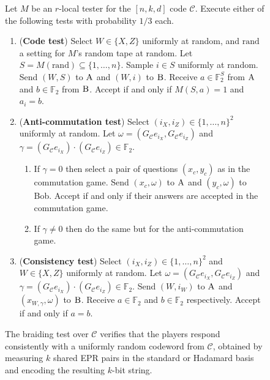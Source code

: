 \documentclass[11pt]{article}
\theoremstyle{definition}
\newcommand{\code}{\mathcal{C}}
\newcommand{\field}{\mathbb{F}_2}
\newcommand{\rand}{\textrm{rand}}
\newcommand{\labelstyle}[1]{\ensuremath{\textsc{#1}}\xspace}
\newcommand{\alice}{\labelstyle{A}}
\newcommand{\bob}{\labelstyle{B}}
\newenvironment{gamespec}{
  \begin{mdframed}[style=figstyle]}{
  \end{mdframed}}
\begin{document}
\begin{figure}[!htbp]
  \centering
  \begin{gamespec}
Let $M$ be an $r$-local tester for the $[n,k,d]$ code $\code$.  Execute either of the following tests with probability $1/3$ each. 
    \begin{enumerate}
      \setlength\itemsep{1pt}
    \item (\textbf{Code test}) Select $W\in \{X,Z\}$ uniformly at random, and $\rand$ a setting for $M$'s random tape at random. Let $S=M(\rand)\subseteq\{1,\ldots,n\}$. Sample $i\in S$ uniformly at random. Send $(W,S)$ to $\alice$ and $(W,i)$ to $\bob$. Receive $a\in \field^S$ from $\alice$ and $b\in \field$ from $\bob$. Accept if and only if $M(S,a)=1$ and $a_i = b$.  
    \item (\textbf{Anti-commutation test}) Select $(i_X,i_Z)\in \{1,\ldots,n\}^2 $ uniformly at random. Let $\omega = (G_\code e_{i_X}, G_\code e_{i_Z})$ and $\gamma =  (G_\code e_{i_X}) \cdot(G_\code e_{i_Z}) \in \field$.
		\begin{enumerate}
		\item If $\gamma=0$ then select a pair of questions $(x_c,y_c)$ as in the commutation game. Send $(x_c,\omega)$ to $\alice$ and $(y_c,\omega)$ to Bob. Accept if and only if their answers are accepted in the commutation game. 
		\item If $\gamma\neq 0$ then do the same but for the anti-commutation game. 
		\end{enumerate} 
		 \item (\textbf{Consistency test}) Select $(i_X,i_Z)\in \{1,\ldots,n\}^2 $ and $W\in \{X,Z\}$ uniformly at random. Let $\omega=(G_\code e_{i_X}, G_\code e_{i_Z})$ and $\gamma = (G_\code e_{i_X}) \cdot(G_\code e_{i_Z}) \in \field$. Send $(W,i_W)$ to $\alice$ and $(x_{W,\gamma},\omega)$ to $\bob$. Receive $a\in \field$ and $b\in \field$ respectively. Accept if and only if $a=b$. 
    \end{enumerate}
  \end{gamespec}
  \caption{The braiding test over $\code$ verifies that the players respond consistently with a uniformly random codeword from $\code$, obtained by measuring $k$ shared EPR pairs in the standard or Hadamard basis and encoding the resulting $k$-bit string.}
  \label{fig:braiding-test}
\end{figure}
\end{document}
